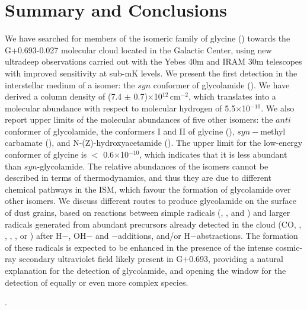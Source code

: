 \documentclass[twocolumn]{aastex63}
\begin{document}
\section{Summary and Conclusions}

We have searched for members of the isomeric family of glycine () towards the G+0.693-0.027 molecular cloud located in the Galactic Center, using new ultradeep observations carried out with the Yebes 40m and IRAM 30m telescopes with improved sensitivity at sub-mK levels. We present the first detection in the interstellar medium of a  isomer: the $syn$ conformer of glycolamide (). 
We have derived a column density of (7.4 $\pm$ 0.7)$\times$10$^{12}$\,cm$^{-2}$, which translates into a molecular abundance with respect to molecular hydrogen of 5.5$\times$10$^{-10}$. 
We also report upper limits of the molecular abundances of five other isomers: the $anti$ conformer of glycolamide, the conformers I and II of glycine (), $syn-$methyl carbamate (), and N-(Z)-hydroxyacetamide (). 
The upper limit for the low-energy conformer of glycine is $<$ 0.6$\times$10$^{-10}$, which indicates that it is less abundant than $syn$-glycolamide. The relative abundances of the  isomers cannot be described in terms of thermodynamics, and thus they are due to different chemical pathways in the ISM, which favour the formation of glycolamide over other isomers.
We discuss different routes to produce glycolamide on the surface of dust grains, based on reactions between simple radicals (, ,  and ) and larger radicals generated from abundant precursors already detected in the cloud (CO, , , , ,  or ) after H$-$, OH$-$ and $-$additions, and/or H$-$abstractions. The formation of these radicals is expected to be enhanced in the presence of the intense cosmic-ray secondary ultraviolet field likely present in G+0.693, providing a natural explanation for the detection of glycolamide, and opening the window for the detection of equally or even more complex species.

.
\end{document}
